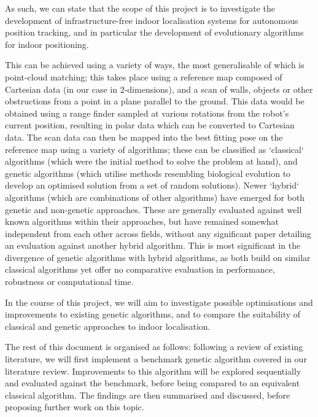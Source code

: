 \documentclass[authoryearcitations]{UoYCSproject}
\begin{document}
As such, we can state that the scope of this project is to investigate the development of infrastructure-free indoor localisation systems for autonomous position tracking, and in particular the development of evolutionary algorithms for indoor positioning.
\newline

This can be achieved using a variety of ways, the most generalisable of which is point-cloud matching; this takes place using a reference map composed of Cartesian data (in our case in 2-dimensions), and a scan of walls, objects or other obstructions from a point in a plane parallel to the ground. This data would be obtained using a range finder sampled at various rotations from the robot's current position, resulting in polar data which can be converted to Cartesian data. The scan data can then be mapped into the best fitting pose on the reference map using a variety of algorithms; these can be classified as `classical` algorithms (which were the initial method to solve the problem at hand), and genetic algorithms (which utilise methods resembling biological evolution to develop an optimised solution from a set of random solutions). Newer `hybrid` algorithms (which are combinations of other algorithms) have emerged for both genetic and non-genetic approaches. These are generally evaluated against well known algorithms within their approaches, but have remained somewhat independent from each other across fields, without any significant paper detailing an evaluation against another hybrid algorithm. This is most significant in the divergence of genetic algorithms with hybrid algorithms, as both build on similar classical algorithms yet offer no comparative evaluation in performance, robustness or computational time.\newline

In the course of this project, we will aim to investigate possible optimisations and improvements to existing genetic algorithms, and to compare the suitability of classical and genetic approaches to indoor localisation. \newline

The rest of this document is organised as follows: following a review of existing literature, we will first implement a benchmark genetic algorithm covered in our literature review. Improvements to this algorithm will be explored sequentially and evaluated against the benchmark, before being compared to an equivalent classical algorithm. The findings are then summarised and discussed, before proposing further work on this topic.
\end{document}
